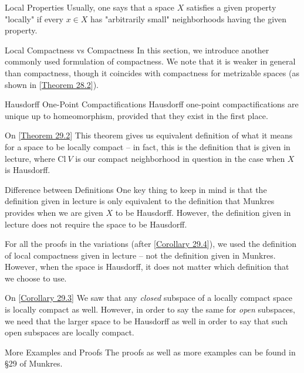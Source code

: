 \begin{remarkBox}{Local Properties}
    Usually, one says that a space \( X \) satisfies a given property "locally" if 
    every \( x \in X \) has "arbitrarily small" neighborhoods having the given property.
\end{remarkBox}

\begin{remarkBox}{Local Compactness vs Compactness}
    In this section, we introduce another commonly used formulation of 
    compactness.
    We note that it is weaker in general than compactness, though it 
    coincides with compactness for metrizable spaces (as shown in 
    [\hyperlink{thm:28.2}{Theorem 28.2}]).
\end{remarkBox}

\begin{remarkBox}{Hausdorff One-Point Compactifications}
    Hausdorff one-point compactifications are unique up to homeomorphism, 
    provided that they exist in the first place.
\end{remarkBox}

\begin{remarkBox}{On [\hyperlink{thm:29.2}{Theorem 29.2}]}
    This theorem gives us equivalent definition of what it means for a space to be 
    locally compact -- in fact, this is the definition that is given in lecture, where 
    \( \mathrm{Cl} \ V \) is our compact neighborhood in question in the case when 
    \( X \) is Hausdorff.
\end{remarkBox}

\begin{remarkBox}{Difference between Definitions}
    One key thing to keep in mind is that the definition given in lecture is only 
    equivalent to the definition that Munkres provides when we are given \( X \) to 
    be Hausdorff. 
    However, the definition given in lecture does not require the space to be 
    Hausdorff.

    \baseSkip 

    For all the proofs in the variations 
    (after [\hyperlink{cor:29.4}{Corollary 29.4}]), we used the definition of local 
    compactness given in lecture -- not the definition given in Munkres. 
    However, when the space is Hausdorff, it does not matter which definition that we 
    choose to use.
\end{remarkBox}

\begin{remarkBox}{On [\hyperlink{cor:29.3}{Corollary 29.3}]}
    We saw that any \textit{closed} subspace of a locally compact space is 
    locally compact as well. 
    However, in order to say the same for \textit{open} subspaces, we need that the 
    larger space to be Hausdorff as well in order to say that such open subspaces 
    are locally compact.
\end{remarkBox}

\begin{remarkBox}{More Examples and Proofs}
    The proofs as well as more examples can be found in \S 29 of Munkres.
\end{remarkBox}